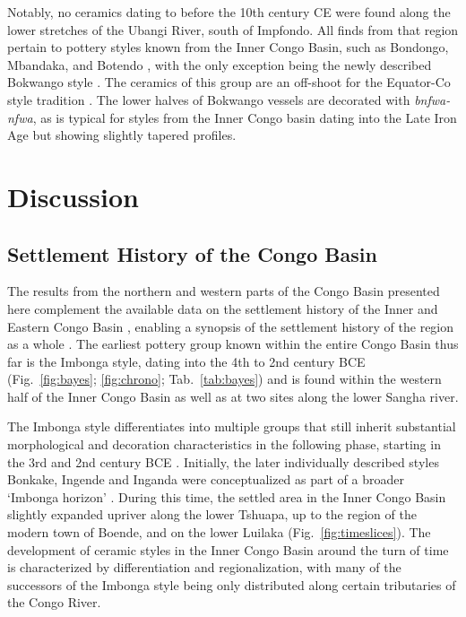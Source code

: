 \documentclass[smallextended,natbib]{svjour3}       %
\begin{document}
Notably, no ceramics dating to before the 10th century CE were found along the lower stretches of the Ubangi River, south of Impfondo. All finds from that region pertain to pottery styles known from the Inner Congo Basin, such as Bondongo, Mbandaka, and Botendo \citep[172--181]{Seidensticker.2021e}, with the only exception being the newly described Bokwango style \citep[Fig.~\ref{fig:ubangi}.10--11;][96--99]{Seidensticker.2021e}. The ceramics of this group are an off-shoot for the Equator-Co style tradition \citep{Wotzka.1995}. The lower halves of Bokwango vessels are decorated with \textit{bnfwa-nfwa}, as is typical for styles from the Inner Congo basin dating into the Late Iron Age but showing slightly tapered profiles.

\section*{Discussion}

\subsection*{Settlement History of the Congo Basin}

The results from the northern and western parts of the Congo Basin presented here complement the available data on the settlement history of the Inner \citep{Wotzka.1995} and Eastern Congo Basin \citep{LivingstoneSmith.2017}, enabling a synopsis of the settlement history of the region as a whole \citep[218--244]{Seidensticker.2021e}. The earliest pottery group known within the entire Congo Basin thus far is the Imbonga style, dating into the 4th to 2nd century BCE (Fig.~\ref{fig:bayes}; \ref{fig:chrono}; Tab.~\ref{tab:bayes}) and is found within the western half of the Inner Congo Basin \citep[Fig.~\ref{fig:timeslices};][59--68]{Wotzka.1995} as well as at two sites along the lower Sangha river.

The Imbonga style differentiates into multiple groups that still inherit substantial morphological and decoration characteristics in the following phase, starting in the 3rd and 2nd century BCE \citep[219--224]{Seidensticker.2021e}. Initially, the later individually described styles Bonkake, Ingende and Inganda \citep[Fig.~\ref{fig:bayes}; \ref{fig:chrono}; Tab.~\ref{tab:bayes};][68--84]{Wotzka.1995} were conceptualized as part of a broader ‘Imbonga horizon’ \citep{Eggert.1983}. During this time, the settled area in the Inner Congo Basin slightly expanded upriver along the lower Tshuapa, up to the region of the modern town of Boende, and on the lower Luilaka (Fig.~\ref{fig:timeslices}). The development of ceramic styles in the Inner Congo Basin around the turn of time is characterized by differentiation and regionalization, with many of the successors of the Imbonga style being only distributed along certain tributaries of the Congo River.
\end{document}
